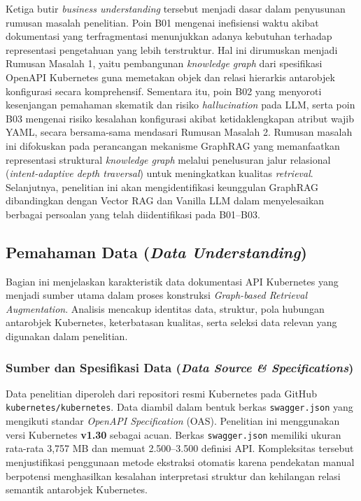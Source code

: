 Ketiga butir \textit{business understanding} tersebut menjadi dasar dalam penyusunan rumusan masalah penelitian. Poin B01 mengenai inefisiensi waktu akibat dokumentasi yang terfragmentasi menunjukkan adanya kebutuhan terhadap representasi pengetahuan yang lebih terstruktur. Hal ini dirumuskan menjadi Rumusan Masalah 1, yaitu pembangunan \textit{knowledge graph} dari spesifikasi OpenAPI Kubernetes guna memetakan objek dan relasi hierarkis antarobjek konfigurasi secara komprehensif. Sementara itu, poin B02 yang menyoroti kesenjangan pemahaman skematik dan risiko \textit{hallucination} pada LLM, serta poin B03 mengenai risiko kesalahan konfigurasi akibat ketidaklengkapan atribut wajib YAML, secara bersama-sama mendasari Rumusan Masalah 2. Rumusan masalah ini difokuskan pada perancangan mekanisme GraphRAG yang memanfaatkan representasi struktural \textit{knowledge graph} melalui penelusuran jalur relasional (\textit{intent-adaptive depth traversal}) untuk meningkatkan kualitas \textit{retrieval}. Selanjutnya, penelitian ini akan mengidentifikasi keunggulan GraphRAG dibandingkan dengan Vector RAG dan Vanilla LLM dalam menyelesaikan berbagai persoalan yang telah diidentifikasi pada B01--B03.

\subsection{Pemahaman Data (\textit{Data Understanding})}
Bagian ini menjelaskan karakteristik data dokumentasi API Kubernetes yang menjadi sumber utama dalam proses konstruksi \textit{Graph-based Retrieval Augmentation}. Analisis mencakup identitas data, struktur, pola hubungan antarobjek Kubernetes, keterbatasan kualitas, serta seleksi data relevan yang digunakan dalam penelitian.

    \subsubsection{Sumber dan Spesifikasi Data (\textit{Data Source \& Specifications})}
    Data penelitian diperoleh dari repositori resmi Kubernetes pada GitHub \texttt{kubernetes/\allowbreak{}kubernetes}. Data diambil dalam bentuk berkas \texttt{swagger.json} yang mengikuti standar \textit{OpenAPI Specification} (OAS). Penelitian ini menggunakan versi Kubernetes \textbf{v1.30} sebagai acuan. Berkas \texttt{swagger.json} memiliki ukuran rata-rata 3,757 MB dan memuat 2.500--3.500 definisi API. Kompleksitas tersebut menjustifikasi penggunaan metode ekstraksi otomatis karena pendekatan manual berpotensi menghasilkan kesalahan interpretasi struktur dan kehilangan relasi semantik antarobjek Kubernetes.

